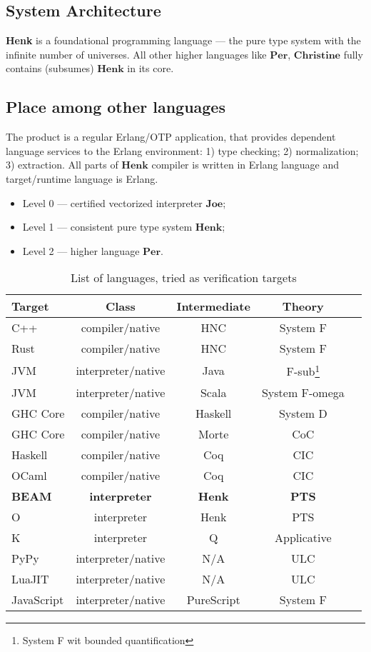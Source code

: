 \documentclass{article}
\begin{document}
\subsection{System Architecture}
{\bf Henk} is a foundational programming language --- the pure type system with the infinite number of universes.
All other higher languages like $\mathbf{Per}$, $\mathbf{Christine}$ fully contains (subsumes) $\mathbf{Henk}$ in its core.

\subsection{Place among other languages}
The product is a regular Erlang/OTP application, that provides dependent language services to the Erlang environment:
1) type checking;
2) normalization;
3) extraction.
All parts of $\mathbf{Henk}$ compiler is written in Erlang language and target/runtime language is Erlang.

\begin{itemize}
\item Level 0 --- certified vectorized interpreter $\mathbf{Joe}$;
\item Level 1 --- consistent pure type system $\mathbf{Henk}$;
\item Level 2 --- higher language $\mathbf{Per}$.
\end{itemize}

\begin{table}[h]
\begin{center}
\caption{List of languages, tried as verification targets}
\label{tab:a}
\begin{tabular}{lcccc}
\hline
{\bf Target} & {\bf Class} & {\bf Intermediate} & {\bf Theory}\\
\hline
C++        & compiler/native      & HNC & System F\\
Rust       & compiler/native      & HNC & System F\\
JVM        & interpreter/native   & Java    & F-sub\footnote{System F wit bounded quantification}\\
JVM        & interpreter/native   & Scala   & System F-omega\\
GHC Core   & compiler/native      & Haskell & System D\\
GHC Core   & compiler/native      & Morte   & CoC\\
Haskell    & compiler/native      & Coq     & CIC\\
OCaml      & compiler/native      & Coq     & CIC\\
{\bf BEAM} & {\bf interpreter} & {\bf Henk}   & {\bf PTS} \\
O          & interpreter          & Henk  & PTS \\
K          & interpreter          & Q   & Applicative \\
PyPy       & interpreter/native   & N/A & ULC \\
LuaJIT     & interpreter/native   & N/A & ULC \\
JavaScript & interpreter/native & PureScript & System F\\
\hline
\end{tabular}
\end{center}
\end{table}
\end{document}
